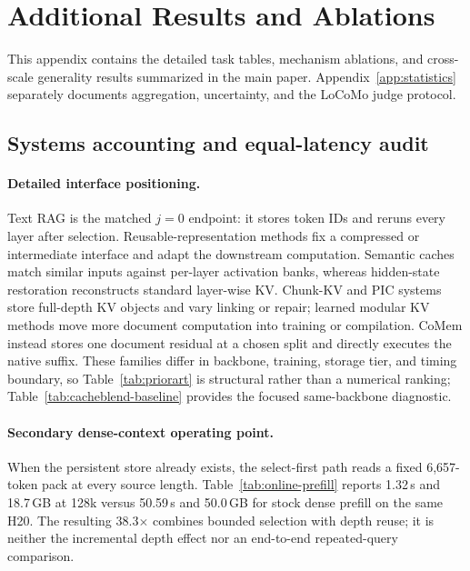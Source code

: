 \section{Additional Results and Ablations}
\label{sec:appendix}

This appendix contains the detailed task tables, mechanism ablations, and
cross-scale generality results summarized in the main paper.
Appendix~\ref{app:statistics} separately documents aggregation, uncertainty,
and the LoCoMo judge protocol.

\subsection{Systems accounting and equal-latency audit}
\label{app:systems}

\paragraph{Detailed interface positioning.}
Text RAG is the matched $j{=}0$ endpoint: it stores token IDs and reruns every
layer after selection. Reusable-representation methods fix a compressed or
intermediate interface and adapt the downstream computation. Semantic caches
match similar inputs against per-layer activation banks, whereas hidden-state
restoration reconstructs standard layer-wise KV. Chunk-KV and PIC systems store
full-depth KV objects and vary linking or repair; learned modular KV methods
move more document computation into training or compilation. CoMem instead
stores one document residual at a chosen split and directly executes the native
suffix. These families differ in backbone, training, storage tier, and timing
boundary, so Table~\ref{tab:priorart} is structural rather than a numerical
ranking; Table~\ref{tab:cacheblend-baseline} provides the focused same-backbone
diagnostic.

\paragraph{Secondary dense-context operating point.}
When the persistent store already exists, the select-first path reads a fixed
6,657-token pack at every source length. Table~\ref{tab:online-prefill} reports
1.32\,s and 18.7\,GB at 128k versus 50.59\,s and 50.0\,GB for stock dense
prefill on the same H20. The resulting 38.3$\times$ combines bounded selection
with depth reuse; it is neither the incremental depth effect nor an end-to-end
repeated-query comparison.

